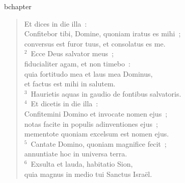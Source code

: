 bchapter\begin{verse}\vspace{-19pt}Et dices in die illa~:\\ Confitebor tibi, Domine, quoniam iratus es mihi~;\\ conversus est furor tuus, et consolatus es me.\\
${}^{2}$~Ecce Deus salvator meus~;\\ fiducialiter agam, et non timebo~:\\ quia fortitudo mea et laus mea Dominus,\\ et factus est mihi in salutem.\\
${}^{3}$~Haurietis aquas in gaudio de fontibus salvatoris.\\
${}^{4}$~Et dicetis in die illa~:\\ Confitemini Domino et invocate nomen ejus~;\\ notas facite in populis adinventiones ejus~;\\ mementote quoniam excelsum est nomen ejus.\\
${}^{5}$~Cantate Domino, quoniam magnifice fecit~;\\ annuntiate hoc in universa terra.\\
${}^{6}$~Exsulta et lauda, habitatio Sion,\\ quia magnus in medio tui Sanctus Isra\"el.\end{verse}



